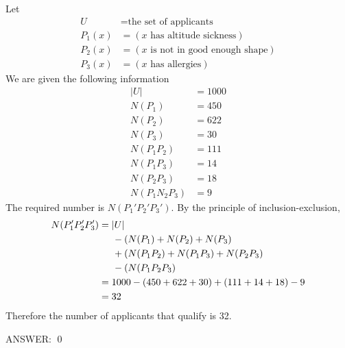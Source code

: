 Let 
\begin{align*}
U &= \text{the set of applicants} \\
P_1(x) &= (x \text{ has altitude sickness}) \\
P_2(x) &= (x\text{ is not in good enough shape}) \\
P_3(x) &= (x\text{ has allergies}) 
\end{align*}
We are given the following information
\begin{align*}
|U| &= 1000 \\
N(P_1) &= 450 \\
N(P_2) &= 622 \\
N(P_3) &= 30 \\
N(P_1 P_2) &= 111 \\
N(P_1 P_3) &= 14 \\
N(P_2 P_3) &= 18 \\
N(P_1 N_2 P_3) &= 9
\end{align*}
The required number is $N(P_1' P_2' P_3')$.
By the principle of inclusion-exclusion,
\begin{align*}
N(P_1' P_2' P_3') 
&= |U| \\
&\hspace{0.5cm} - (N(P_1) + N(P_2) + N(P_3) \\  
&\hspace{0.5cm} + (N(P_1 P_2) + N(P_1 P_3) + N(P_2 P_3) \\  
&\hspace{0.5cm} - (N(P_1 P_2 P_3) \\ 
&= 1000 - (450 + 622 + 30) + (111 + 14 + 18) - 9 \\
&= 32
\end{align*}
Therefore the number of applicants that qualify is 32.

ANSWER:
\qed
